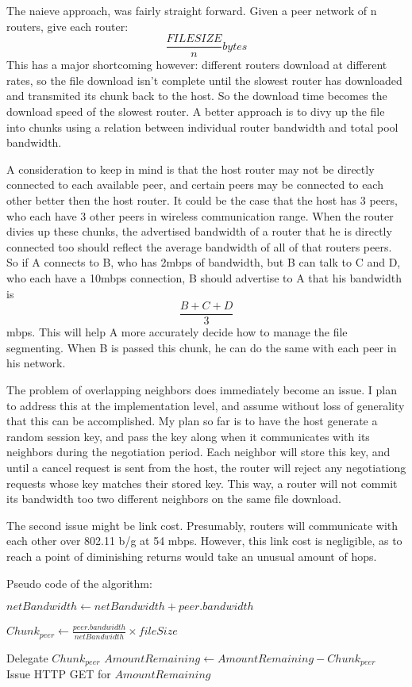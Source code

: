 \documentclass[12pt]{article}
\begin{document}
			The naieve approach, was fairly straight forward. Given a peer network of n routers, give each router: $$\frac{FILESIZE}{n} bytes$$ This has a major shortcoming however: different routers download at different rates, so the file download isn't complete until the slowest router has downloaded and transmited its chunk back to the host. So the download time becomes the download speed of the slowest router. A better approach is to divy up the file into chunks using a relation between individual router bandwidth and total pool bandwidth. 

			A consideration to keep in mind is that the host router may not be directly connected to each available peer, and certain peers may be connected to each other better then the host router. It could be the case that the host has 3 peers, who each have 3 other peers in wireless communication range. When the router divies up these chunks, the advertised bandwidth of a router that he is directly connected too should reflect the average bandwidth of all of that routers peers. So if A connects to B, who has 2mbps of bandwidth, but B can talk to C and D, who each have a 10mbps connection, B should advertise to A that his bandwidth is $$\frac{B + C + D}{3}$$ mbps. This will help A more accurately decide how to manage the file segmenting. When B is passed this chunk, he can do the same with each peer in his network.

			The problem of overlapping neighbors does immediately become an issue. I plan to address this at the implementation level, and assume without loss of generality that this can be accomplished. My plan so far is to have the host generate a random session key, and pass the key along when it communicates with its neighbors during the negotiation period. Each neighbor will store this key, and until a cancel request is sent from the host, the router will reject any negotiationg requests whose key matches their stored key. This way, a router will not commit its bandwidth too two different neighbors on the same file download.

			The second issue might be link cost. Presumably, routers will communicate with each other over 802.11 b/g at 54 mbps. However, this link cost is negligible, as to reach a point of diminishing returns would take an unusual amount of hops.

			Pseudo code of the algorithm:

			\begin{algorithmic}
					\State $netBandwidth\gets netBandwidth + peer.bandwidth$
				\EndFor

					\State $Chunk_{peer} \gets \frac{peer.bandwidth}{netBandwidth} \times{fileSize}$
				\EndFor

					Delegate $Chunk_{peer}$
					\State $AmountRemaining \gets AmountRemaining - Chunk_{peer}$
				\EndFor\\
				Issue HTTP GET for $AmountRemaining$
			\end{algorithmic}
\end{document}

